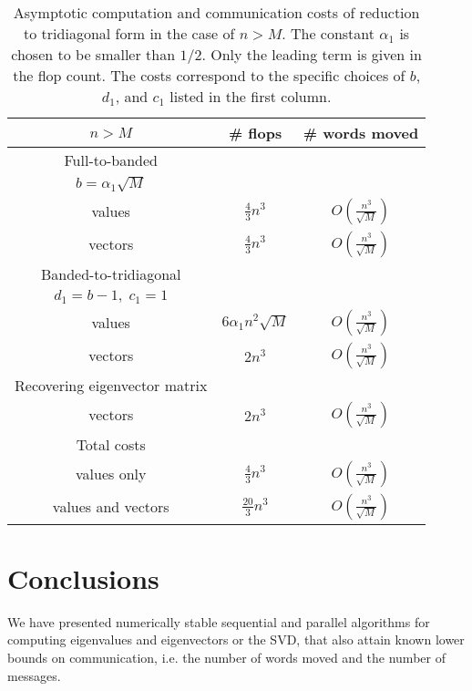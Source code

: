 \documentclass{article}
\def\lt{\left}
\def\rt{\right}
\theoremstyle{definition}
\begin{document}
\begin{table} \centering
  \begin{tabular}{| c | c | c |} \hline
      $n>M$ & \# flops & \# words moved \\ \hline \hline
    Full-to-banded & & \\
    $b=\alpha_1 \sqrt M$ & & \\
    values & $\frac43 n^3$ & $O\lt(\frac{n^3}{\sqrt M}\rt)$\\
    vectors & $\frac43 n^3$ & $O\lt(\frac{n^3}{\sqrt M}\rt)$ \\ \hline
    Banded-to-tridiagonal & & \\
    $d_1 = b-1, \; c_1 = 1$ & & \\
    values & $6\alpha_1n^2\sqrt M$ & $O\lt(\frac{n^3}{\sqrt M}\rt)$ \\
    vectors & $2 n^3$ & $O\lt(\frac{n^3}{\sqrt M}\rt)$ \\ \hline
    Recovering eigenvector matrix & & \\
    vectors & $2n^3$ & $O\lt(\frac{n^3}{\sqrt M}\rt)$ \\ \hline \hline
    Total costs & & \\
    values only & $\frac43 n^3$ & $O\lt(\frac{n^3}{\sqrt M}\rt)$ \\
    values and vectors & $\frac{20}{3}n^3$ & $O\lt(\frac{n^3}{\sqrt M}\rt)$ \\ \hline
  \end{tabular}
  \caption{Asymptotic computation and communication costs of reduction to tridiagonal form in the case of $n>M$.  The constant $\alpha_1$ is chosen to be smaller than $1/2$.  Only the leading term is given in the flop count.  The costs correspond to the specific choices of $b$, $d_1$, and $c_1$ listed in the first column.}
  \label{tab:SBRcase2}
\end{table} 

\section{Conclusions} 
\label{Conc}

We have presented numerically stable sequential and parallel
algorithms for computing eigenvalues and eigenvectors or the SVD, 
that also attain known lower bounds on communication, 
i.e. the number of words moved and the number of messages.
\end{document}
